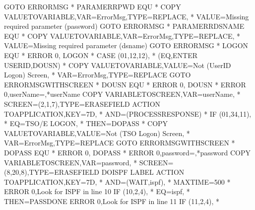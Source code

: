 \documentclass[letterpaper,10pt,english]{sphinxmanual}
\begin{document}
\begin{sphinxVerbatim}[commandchars=\\\{\}]
   GOTO\PYGZdl{} ERRORMSG
*
PARAM\PYGZus{}ERR\PYGZus{}PWD EQU   *
   COPY\PYGZdl{} VALUE\PYGZhy{}TO\PYGZhy{}VARIABLE,VAR=ErrorMsg,TYPE=REPLACE,            *
         VALUE=\PYGZsq{}Missing required parameter (password)\PYGZsq{}
   GOTO\PYGZdl{} ERRORMSG
*
PARAM\PYGZus{}ERR\PYGZus{}DSNAME EQU   *
   COPY\PYGZdl{} VALUE\PYGZhy{}TO\PYGZhy{}VARIABLE,VAR=ErrorMsg,TYPE=REPLACE,            *
         VALUE=\PYGZsq{}Missing required parameter (dsname)\PYGZsq{}
   GOTO\PYGZdl{} ERRORMSG
*
LOGON    EQU   *
   ERROR\PYGZdl{} 0,\PYGZsq{}\PYGZhy{}\PYGZhy{}\PYGZhy{} LOGON \PYGZsq{}
*
   CASE\PYGZdl{} (01,12,12),                                             *
         (EQ,\PYGZsq{}ENTER USERID\PYGZsq{},DOUSN)
*
   COPY\PYGZdl{} VALUE\PYGZhy{}TO\PYGZhy{}VARIABLE,VALUE=\PYGZsq{}Not (UserID Logon) Screen\PYGZsq{},    *
         VAR=ErrorMsg,TYPE=REPLACE
   GOTO\PYGZdl{} ERRORMSG\PYGZus{}WITH\PYGZus{}SCREEN
*
DOUSN    EQU   *
   ERROR\PYGZdl{} 0,\PYGZsq{}\PYGZhy{}\PYGZhy{}\PYGZhy{} DOUSN\PYGZsq{}
*
   ERROR\PYGZdl{} 0,\PYGZsq{}userName=\PYGZsq{},\PYGZsq{}*userName\PYGZsq{}
   COPY\PYGZdl{} VARIABLE\PYGZhy{}TO\PYGZhy{}SCREEN,VAR=\PYGZsq{}userName\PYGZsq{},                      *
         SCREEN=(2,1,7),TYPE=ERASE\PYGZhy{}FIELD
   ACTION\PYGZdl{}  TO\PYGZhy{}APPLICATION,KEY=7D,                               *
         AND=(PROCESS\PYGZhy{}RESPONSE)
*
   IF\PYGZdl{} (01,34,11),                                               *
         EQ=\PYGZsq{}TSO/E LOGON\PYGZsq{},                                       *
         THEN=DOPASS
*
   COPY\PYGZdl{} VALUE\PYGZhy{}TO\PYGZhy{}VARIABLE,VALUE=\PYGZsq{}Not (TSO Logon) Screen\PYGZsq{},       *
         VAR=ErrorMsg,TYPE=REPLACE
   GOTO\PYGZdl{} ERRORMSG\PYGZus{}WITH\PYGZus{}SCREEN
*
DOPASS   EQU   *
   ERROR\PYGZdl{} 0,\PYGZsq{}\PYGZhy{}\PYGZhy{}\PYGZhy{} DOPASS\PYGZsq{}
*
   ERROR\PYGZdl{} 0,\PYGZsq{}password=\PYGZsq{},\PYGZsq{}*password\PYGZsq{}
   COPY\PYGZdl{} VARIABLE\PYGZhy{}TO\PYGZhy{}SCREEN,VAR=\PYGZsq{}password\PYGZsq{},                      *
         SCREEN=(8,20,8),TYPE=ERASE\PYGZhy{}FIELD
DOISPF   LABEL\PYGZdl{}
   ACTION\PYGZdl{}  TO\PYGZhy{}APPLICATION,KEY=7D,                               *
         AND=(WAIT,\PYGZsq{}ispf\PYGZsq{}),                                      *
         MAXTIME=500
*
   ERROR\PYGZdl{} 0,\PYGZsq{}Look for ISPF in line 10\PYGZsq{}
   IF\PYGZdl{} (10,2,4),                                                 *
         EQ=\PYGZsq{}ispf\PYGZsq{},                                              *
         THEN=PASSDONE
   ERROR\PYGZdl{} 0,\PYGZsq{}Look for ISPF in line 11\PYGZsq{}
   IF\PYGZdl{} (11,2,4),                                                 *

\end{sphinxVerbatim}
\end{document}
